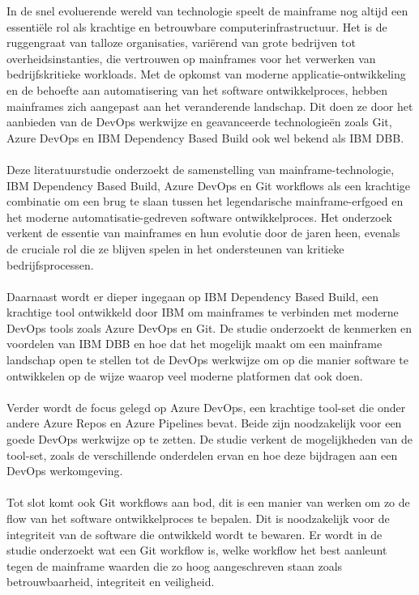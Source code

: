 In de snel evoluerende wereld van technologie speelt de mainframe nog altijd een essentiële rol als krachtige en betrouwbare computerinfrastructuur. Het is de ruggengraat van talloze organisaties, variërend van grote bedrijven tot overheidsinstanties, die vertrouwen op mainframes voor het verwerken van bedrijfskritieke workloads. Met de opkomst van moderne applicatie-ontwikkeling en de behoefte aan automatisering van het software ontwikkelproces, hebben mainframes zich aangepast aan het veranderende landschap. Dit doen ze door het aanbieden van de DevOps werkwijze en geavanceerde technologieën zoals Git, Azure DevOps en IBM Dependency Based Build ook wel bekend als IBM DBB.
\\ \\
Deze literatuurstudie onderzoekt de samenstelling van mainframe-technologie, IBM Dependency Based Build, Azure DevOps en Git workflows als een krachtige combinatie om een brug te slaan tussen het legendarische mainframe-erfgoed en het moderne automatisatie-gedreven software ontwikkelproces. Het onderzoek verkent de essentie van mainframes en hun evolutie door de jaren heen, evenals de cruciale rol die ze blijven spelen in het ondersteunen van kritieke bedrijfsprocessen.
\\ \\
Daarnaast wordt er dieper ingegaan op IBM Dependency Based Build, een krachtige tool ontwikkeld door IBM om mainframes te verbinden met moderne DevOps tools zoals Azure DevOps en Git. De studie onderzoekt de kenmerken en voordelen van IBM DBB en hoe dat het mogelijk maakt om een mainframe landschap open te stellen tot de DevOps werkwijze om op die manier software te ontwikkelen op de wijze waarop veel moderne platformen dat ook doen.
\\ \\
Verder wordt de focus gelegd op Azure DevOps, een krachtige tool-set die onder andere Azure Repos en Azure Pipelines bevat. Beide zijn noodzakelijk voor een goede DevOps werkwijze op te zetten. De studie verkent de mogelijkheden van de tool-set, zoals de verschillende onderdelen ervan en hoe deze bijdragen aan een DevOps werkomgeving.
\\ \\
Tot slot komt ook Git workflows aan bod, dit is een manier van werken om zo de flow van het software ontwikkelproces te bepalen. Dit is noodzakelijk voor de integriteit van de software die ontwikkeld wordt te bewaren. Er wordt in de studie onderzoekt wat een Git workflow is, welke workflow het best aanleunt tegen de mainframe waarden die zo hoog aangeschreven staan zoals betrouwbaarheid, integriteit en veiligheid.
\\ \\
